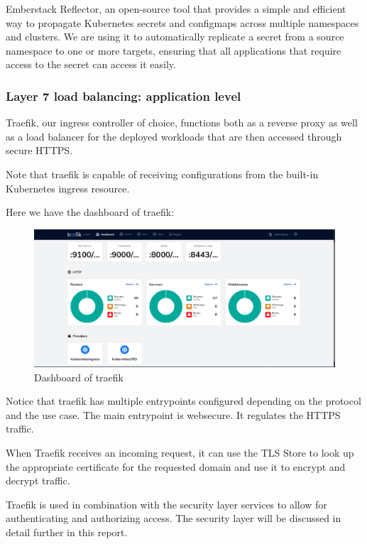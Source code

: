 Emberstack Reflector, an open-source tool that provides a simple and efficient way to propagate Kubernetes secrets and configmaps across multiple namespaces and clusters. We are using it to automatically replicate a secret from a source namespace to one or more targets, ensuring that all applications that require access to the secret can access it easily.

\subsubsection{Layer 7 load balancing: application level }

Traefik, our ingress controller of choice, functions both as a reverse proxy as well as a load balancer for the deployed workloads that are then accessed through secure HTTPS. 

Note that traefik is capable of receiving configurations from the built-in Kubernetes ingress resource. 

Here we have the dashboard of traefik: 

\begin{figure}[H]\centering
\includegraphics[width=1.0\textwidth,angle=00]{assets/f25.png}
\caption{ Dashboard of traefik }
\label{fig:dashboard of traefik}
\end{figure}

Notice that traefik has multiple entrypoints configured depending on the protocol and the use case. The main entrypoint is websecure. It regulates the HTTPS traffic.  

When Traefik receives an incoming request, it can use the TLS Store to look up the appropriate certificate for the requested domain and use it to encrypt and decrypt traffic. 

Traefik is used in combination with the security layer services to allow for authenticating and authorizing access. The security layer will be discussed in detail further in this report. 

